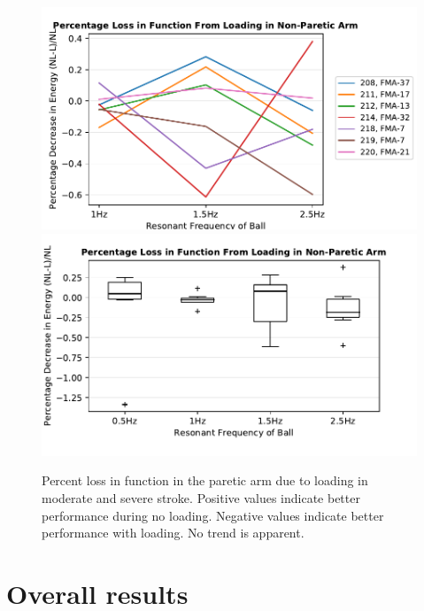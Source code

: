 \documentclass{article}
\begin{document}
\begin{figure}[!ht]
     \centering
     \includegraphics[width=0.49\linewidth]{Plots/pl_A1_indiv_ms.pdf}
     \includegraphics[width=0.49\linewidth]{Plots/pl_A1_ms.pdf}
	\caption{Percent loss in function in the paretic arm due to loading in moderate and severe stroke. Positive values indicate better performance during no loading. Negative values indicate better performance with loading. No trend is apparent.}
\end{figure}


\clearpage
\section{Overall results}
\end{document}
